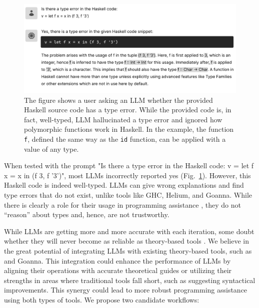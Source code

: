 \begin{figure}[hbt]
  \includegraphics[width=\linewidth]{LLM2}
  \caption[An example where LLM identified a type error in well-typed source code]{\label{fig:llm2}
  The figure shows a user asking an LLM whether the provided Haskell source code has a type error. While the provided code is, in fact, well-typed, LLM hallucinated a type error and ignored how polymorphic functions work in Haskell. In the example, the function \texttt{f},  defined the same way as the \texttt{id} function, can be applied with a value of any type.
    } 
\end{figure}

When tested with the prompt "Is there a type error in the Haskell code: v = let f x = x in (f 3, f '3')", most LLMs incorrectly reported yes (Fig.~\ref{fig:llm2}). However, this Haskell code is indeed well-typed. LLMs can give wrong explanations and find type errors that do not exist, unlike tools like GHC, Helium, and Goanna. While there is clearly a role for their usage in programming assistance \cite{Lee2024-hs}, they do not “reason” about types and, hence, are not trustworthy.

While LLMs are getting more and more accurate with each iteration, some doubt whether they will never become as reliable as theory-based tools \cite{Berglund2023-ig}. We believe in the great potential of integrating LLMs with existing theory-based tools, such as \chameleon{} and Goanna. This integration could enhance the performance of LLMs by aligning their operations with accurate theoretical guides or utilizing their strengths in areas where traditional tools fall short, such as suggesting syntactical improvements. This synergy could lead to more robust programming assistance using both types of tools. We propose two candidate workflows:



